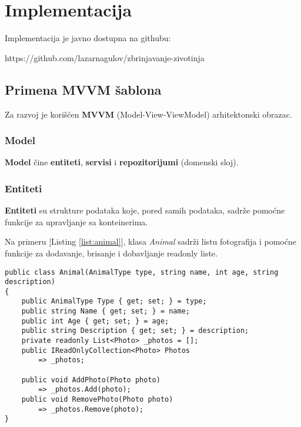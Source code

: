 

\section{Implementacija}
\par Implementacija je javno dostupna na githubu: 
\begin{center}
    https://github.com/lazarnagulov/zbrinjavanje-zivotinja
\end{center}
\subsection{Primena MVVM šablona}
\par Za razvoj je korišćen \textbf{MVVM} (Model-View-ViewModel) arhitektonski obrazac. 
\subsubsection*{Model}
\par \textbf{Model} čine \textbf{entiteti}, \textbf{servisi} i \textbf{repozitorijumi} (domenski sloj). 
\subsubsection*{Entiteti}
\par \textbf{Entiteti} su strukture podataka koje, pored samih podataka, sadrže pomoćne funkcije za upravljanje sa konteinerima. 
\par Na primeru [Listing \ref{list:animal}], klasa \textit{Animal} sadrži listu fotografija i pomoćne funkcije za dodavanje, brisanje i dobavljanje
readonly liste.
\begin{lstlisting}[caption={Primer entiteta}, captionpos=b, label=list:animal]
public class Animal(AnimalType type, string name, int age, string description)
{
    public AnimalType Type { get; set; } = type;
    public string Name { get; set; } = name;
    public int Age { get; set; } = age;
    public string Description { get; set; } = description;
    private readonly List<Photo> _photos = [];
    public IReadOnlyCollection<Photo> Photos 
        => _photos;

    public void AddPhoto(Photo photo) 
        => _photos.Add(photo);
    public void RemovePhoto(Photo photo) 
        => _photos.Remove(photo);
}
\end{lstlisting}

